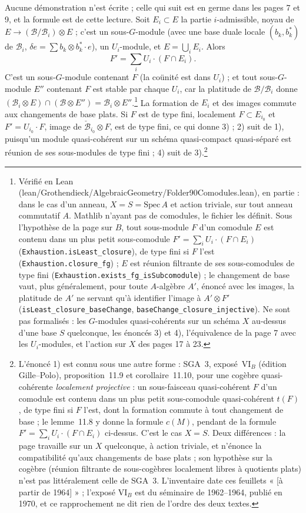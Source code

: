 \documentclass[11pt,a4paper]{article}
\begin{document}
Aucune démonstration n'est écrite ; celle qui suit est en germe dans les
pages 7 et 9, et la formule est de cette lecture. Soit $E_i \subset
E$ la partie $i$-admissible, noyau de $E \to (\mathcal{B}/\mathcal{B}_i)
\otimes E$ ; c'est un sous-$G$-module (avec une base duale locale $(b_k,
b_k^{*})$ de $\mathcal{B}_i$, $\delta e = \sum b_k \otimes b_k^{*} \cdot e$),
un $U_i$-module, et $E = \bigcup_i E_i$. Alors
\[
  F' = \sum_i U_i \cdot (F \cap E_i) .
\]
C'est un sous-$G$-module contenant $F$ (la coünité est dans $U_i$) ; et
tout sous-$G$-module $E''$ contenant $F$ est stable par chaque $U_i$, car la
platitude de $\mathcal{B}/\mathcal{B}_i$ donne $(\mathcal{B}_i \otimes E)
\cap (\mathcal{B} \otimes E'') = \mathcal{B}_i \otimes E''$.\footnote{Vérifié
en Lean (lean/Grothendieck/AlgebraicGeometry/Folder90Comodules.lean), en partie : dans le cas
d'un anneau, $X = S = \mathrm{Spec}\,A$ et action triviale, sur tout anneau
commutatif $A$. Mathlib n'ayant pas de comodules, le fichier les définit.
Sous l'hypothèse de la page sur $B$, tout sous-module $F$ d'un comodule $E$
est contenu dans un plus petit sous-comodule $F' = \sum_i U_i \cdot (F \cap
E_i)$ (\texttt{Exhaustion.isLeast\_closure}), de type fini si $F$ l'est
(\texttt{Exhaustion.closure\_fg}) ; $E$ est réunion filtrante de ses
sous-comodules de type fini (\texttt{Exhaustion.exists\_fg\_isSubcomodule}) ;
le changement de base vaut, plus généralement, pour toute $A$-algèbre $A'$,
énoncé avec les images, la platitude de $A'$ ne servant qu'à identifier
l'image à $A' \otimes F'$ (\texttt{isLeast\_closure\_baseChange},
\texttt{baseChange\_closure\_injective}). Ne sont pas formalisés : les
$G$-modules quasi-cohérents sur un schéma $X$ au-dessus d'une base $S$
quelconque, les énoncés 3) et 4), l'équivalence de la page 7 avec les
$U_i$-modules, et l'action sur $X$ des pages 17 à 23.} La formation de
$E_i$ et des images commute aux changements de base plats. Si $F$ est de
type fini, localement $F \subset E_{i_0}$ et $F' = U_{i_0} \cdot F$, image
de $\check{\mathcal{B}}_{i_0} \otimes F$, est de type fini, ce qui donne
3) ; 2) suit de 1), puisqu'un module quasi-cohérent sur un schéma
quasi-compact quasi-séparé est réunion de ses sous-modules de type fini ;
4) suit de 3).\footnote{L'énoncé 1) est connu sous une autre forme : SGA~3,
exposé~VI$_B$ (édition Gille--Polo), proposition~11.9 et corollaire~11.10,
pour une cogèbre quasi-cohérente \emph{localement projective} : un
sous-faisceau quasi-cohérent $F$ d'un comodule est contenu dans un plus petit
sous-comodule quasi-cohérent $t(F)$, de type fini si $F$ l'est, dont la
formation commute à tout changement de base ; le lemme~11.8 y donne la
formule $c(M)$, pendant de la formule $F' = \sum_i U_i \cdot (F \cap E_i)$
ci-dessus. C'est le cas $X = S$. Deux différences : la page travaille sur un
$X$ quelconque, à action triviale, et n'énonce la compatibilité qu'aux
changements de base plats ; son hypothèse sur la cogèbre (réunion
filtrante de sous-cogèbres localement libres à quotients plats) n'est pas
littéralement celle de SGA~3. L'inventaire date ces feuillets « [à partir de
1964] » ; l'exposé VI$_B$ est du séminaire de 1962--1964, publié en 1970, et
ce rapprochement ne dit rien de l'ordre des deux textes.}
\end{document}
